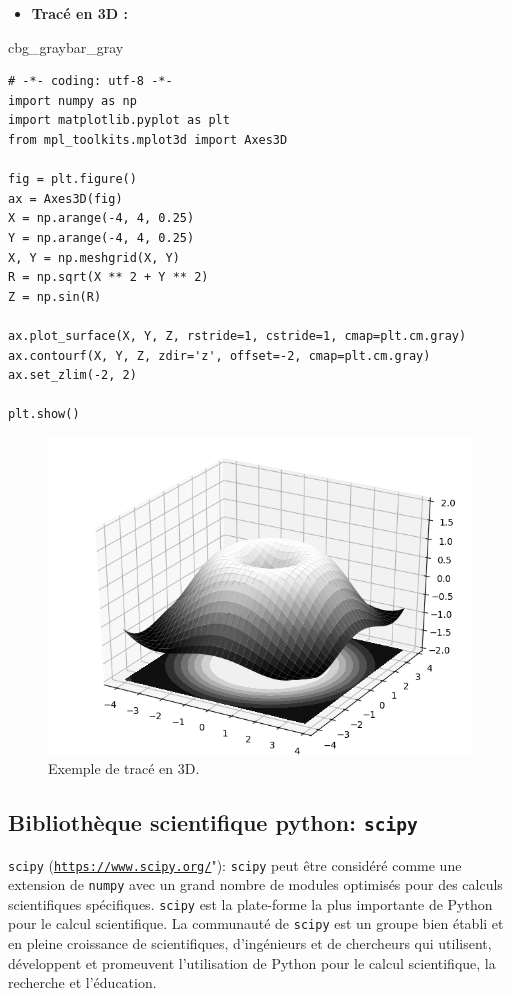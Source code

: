\documentclass[%
oneside,                 %
final,                   %
10pt,french]{article}
\newenvironment{_pro_tight}[2]{
   \def\FrameCommand{\color{#2}\vrule width 1mm\normalcolor\colorbox{#1}}
   \FrameRule0.6pt\MakeFramed {\advance\hsize-2mm\FrameRestore}\vskip3mm}
   {\vskip0mm\endMakeFramed}
\newenvironment{pro}[2]{
\bgroup\rmfamily
\fboxsep=0mm\relax
\begin{_pro_tight}{#1}{#2}
\list{}{\parsep=-2mm\parskip=0mm\topsep=0pt\leftmargin=2mm
\rightmargin=2\leftmargin\leftmargin=4pt\relax}
\item\relax}
{\endlist\end{_pro_tight}\egroup}
\begin{document}
\begin{itemize}
\item \textbf{Tracé en 3D :}
\end{itemize}

\noindent
\begin{pro}{cbg_gray}{bar_gray}\begin{verbatim}
# -*- coding: utf-8 -*-
import numpy as np
import matplotlib.pyplot as plt
from mpl_toolkits.mplot3d import Axes3D

fig = plt.figure()
ax = Axes3D(fig)
X = np.arange(-4, 4, 0.25)
Y = np.arange(-4, 4, 0.25)
X, Y = np.meshgrid(X, Y)
R = np.sqrt(X ** 2 + Y ** 2)
Z = np.sin(R)

ax.plot_surface(X, Y, Z, rstride=1, cstride=1, cmap=plt.cm.gray)
ax.contourf(X, Y, Z, zdir='z', offset=-2, cmap=plt.cm.gray)
ax.set_zlim(-2, 2)

plt.show()
\end{verbatim}
\end{pro}
\noindent


\begin{figure}[!ht]  %
  \centerline{\includegraphics[width=0.7\linewidth]{imgs/Plot3D.png}}
  \caption{
  Exemple de tracé en 3D. \label{fig:3D}
  }
\end{figure}


\subsection{Bibliothèque scientifique python: \texttt{scipy} }
\texttt{scipy} (\href{{https://www.scipy.org/}}{\nolinkurl{https://www.scipy.org/}}"): \texttt{scipy} peut être considéré comme une extension de \texttt{numpy} avec un grand nombre de modules optimisés pour des calculs scientifiques spécifiques. \texttt{scipy} est la plate-forme la plus importante de Python pour le calcul scientifique. La communauté de \texttt{scipy} est un groupe bien établi et en pleine croissance de scientifiques, d’ingénieurs et de chercheurs qui utilisent, développent et promeuvent l’utilisation de Python pour le calcul scientifique, la recherche et l’éducation.
\end{document}
